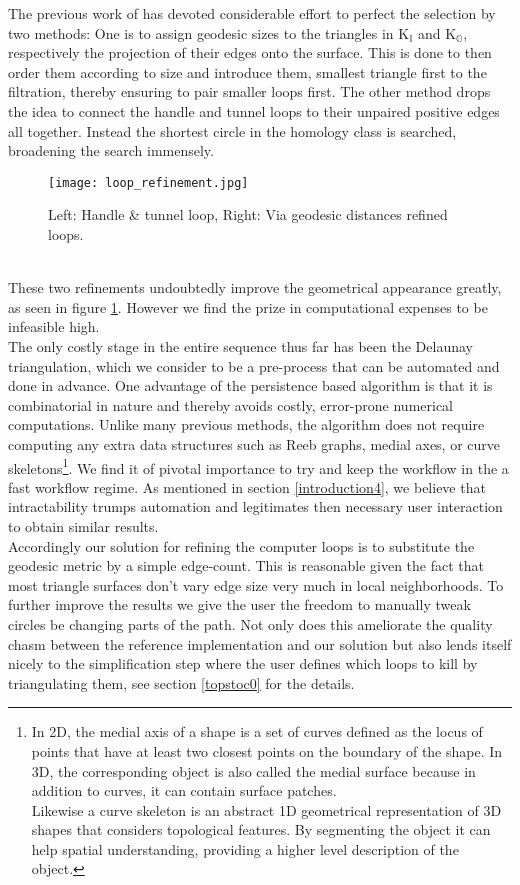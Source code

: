 The previous work of \citep[][]{Dey2007, Dey2008, Dey2009} has devoted considerable effort to perfect the selection by two methods: 
One is to assign geodesic sizes to the triangles in $\mathrm{K}_{\mathbb{I}}$ and $\mathrm{K}_{\mathbb{O}}$, respectively the projection of their edges onto the surface.
This is done to then order them according to size and introduce them, smallest triangle first to the filtration, thereby ensuring to pair smaller loops first.
The other method drops the idea to connect the handle and tunnel loops to their unpaired positive edges all together.
Instead the shortest circle in the homology class is searched, broadening the search immensely.
\begin{figure}[htb]
\centering
\texttt{[image: loop\_refinement.jpg]}
\caption{Left: Handle \& tunnel loop, Right: Via geodesic distances refined loops.}
\label{fig:loop_refinement}
\end{figure}\\
These two refinements undoubtedly improve the geometrical appearance greatly, as seen in figure \ref{fig:loop_refinement}.
However we find the prize in computational expenses to be infeasible high.\\
The only costly stage in the entire sequence thus far has been the Delaunay triangulation, which we consider to be a pre-process that can be automated and done in advance.
One advantage of the persistence based algorithm is that it is combinatorial in nature and thereby avoids costly, error-prone numerical computations.
Unlike many previous methods, the algorithm does not require computing any extra data structures such as Reeb graphs, medial axes, or curve skeletons\footnote{ In 2D, the medial axis of a shape is a set of curves defined as the locus of points that have at least two closest points on the boundary of the shape. In 3D, the corresponding object is also called the medial surface because in addition to curves, it can contain surface patches.\\
Likewise a curve skeleton is an abstract 1D geometrical representation of 3D shapes that considers topological features. By segmenting the object it can help spatial understanding, providing a higher level description of the object.}.
We find it of pivotal importance to try and keep the workflow in the a fast workflow regime.
As mentioned in section \ref{introduction4}, we believe that intractability trumps automation and legitimates then necessary user interaction to obtain similar results.\\
Accordingly our solution for refining the computer loops is to substitute the geodesic metric by a simple edge-count.
This is reasonable given the fact that most triangle surfaces don't vary edge size very much in local neighborhoods.
To further improve the results we give the user the freedom to manually tweak circles be changing parts of the path.
Not only does this ameliorate the quality chasm between the reference implementation and our solution but also lends itself nicely to the simplification step where the user defines which loops to kill by triangulating them, see section \ref{topstoc0} for the details.

